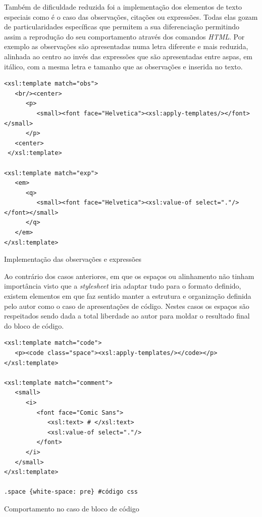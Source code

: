 \documentclass[a4paper]{article}
\begin{document}
\hspace{1cm}Também de dificuldade reduzida foi a implementação dos elementos de texto especiais como é o caso das observações, citações ou expressões. Todas elas gozam de particularidades específicas que permitem a sua diferenciação permitindo assim a reprodução do seu comportamento através dos comandos \emph{HTML}. Por exemplo as observações são apresentadas numa letra diferente e mais reduzida, alinhada ao centro ao invés das expressões que são apresentadas entre aspas, em itálico, com a mesma letra e tamanho que as observações e inserida no texto.\\

\begin{small}
\begin{lstlisting}  
<xsl:template match="obs">
   <br/><center>
      <p>
         <small><font face="Helvetica"><xsl:apply-templates/></font></small>
      </p>
   <center>
 </xsl:template>

<xsl:template match="exp">
   <em>
      <q>
         <small><font face="Helvetica"><xsl:value-of select="."/></font></small>
      </q>
   </em>
</xsl:template>
\end{lstlisting}
\end{small}
\begin{footnotesize}
\begin{center}
\caption{Implementação das observações e expressões}
\end{center}
\end{footnotesize}

\hspace{1cm}Ao contrário dos casos anteriores, em que os espaços ou alinhamento não tinham importância visto que a \emph{stylesheet} iria adaptar tudo para o formato definido, existem elementos em que faz sentido manter a estrutura e organização definida pelo autor como o caso de apresentações de código. Nestes casos os espaços são respeitados sendo dada a total liberdade ao autor para moldar o resultado final do bloco de código.\\

\begin{small}
\begin{lstlisting}        
<xsl:template match="code">
   <p><code class="space"><xsl:apply-templates/></code></p>
</xsl:template>

<xsl:template match="comment">
   <small>
      <i>
         <font face="Comic Sans">
            <xsl:text> # </xsl:text>
            <xsl:value-of select="."/>
         </font>
      </i>
   </small>
</xsl:template>

.space {white-space: pre} #código css
\end{lstlisting}
\end{small}
\begin{footnotesize}
\begin{center}
\caption{Comportamento no caso de bloco de código}
\end{center}
\end{footnotesize}
\end{document}
